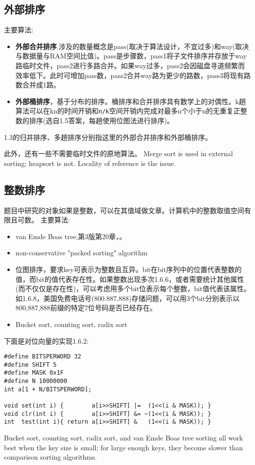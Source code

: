 \subsection{外部排序}
主要算法\cite{wikipedia}:
\begin{itemize}
    \item 
        \textbf{外部合并排序}\cite{wikipedia}.涉及的数量概念是pass(取决于算法设计，不宜过多)和way(取决与数据量与RAM空间比值)。pass是步骤数，pass1将子文件排序并存放于way路临时文件，pass2进行多路合并。如果way过多，pass2会因磁盘寻道频繁而效率低下。此时可增加pass数，pass2合并way路为更少的路数，pass3将现有路数合并成1路。
    \item 
	\textbf{外部桶排序}，基于分布的排序。桶排序和合并排序具有数学上的对偶性\cite{weijipedia}。k趟算法可以在kn的时间开销和\verb|n/k|空间开销内完成对最多n个小于n的无重复正整数的排序(选自\cite{pp}1.5答案，每趟使用位图法进行排序)。
\end{itemize}
\cite{pp}1.3的归并排序、多趟排序分别指这里的外部合并排序和外部桶排序。

此外，还有一些不需要临时文件的原地算法。 Merge sort is used in external sorting; heapsort is not. Locality of reference is the issue.



\subsection{整数排序}
\cite{wikipedia}
题目中研究的对象如果是整数，可以在其值域做文章。计算机中的整数取值空间有限且可数。
主要算法:
\begin{itemize}
    \item 
van Emde Boas tree,\cite{ita}第3版第20章，\cite{wikipedia}。
    \item 
non-conservative "packed sorting" algorithm
    \item 
	位图排序，要求key可表示为整数且互异。bit在bit序列中的位置代表整数的值，而bit的值代表存在性。如果整数出现多次\cite{pp}1.6.6，或者需要统计其他属性(而不仅仅是存在性)，可以考虑用多个bit位表示每个整数，bit值代表该属性。如\cite{pp}1.6.8，美国免费电话号(800.887.888)存储问题，可以用3个bit分别表示以800,887,888前缀的特定7位号码是否已经存在\cite{self}。
    \item 
Bucket sort, counting sort, radix sort
\end{itemize}

下面是对位向量的实现\cite{pp}1.6.2:
\begin{verbatim}
#define BITSPERWORD 32
#define SHIFT 5
#define MASK 0x1F
#define N 10000000
int a[1 + N/BITSPERWORD];

void set(int i) {        a[i>>SHIFT] |=  (1<<(i & MASK)); }
void clr(int i) {        a[i>>SHIFT] &= ~(1<<(i & MASK)); }
int  test(int i){ return a[i>>SHIFT] &   (1<<(i & MASK)); }
\end{verbatim}

Bucket sort, counting sort, radix sort, and van Emde Boas tree sorting all work best when the key size is small; for large enough keys, they become slower than comparison sorting algorithms. 




